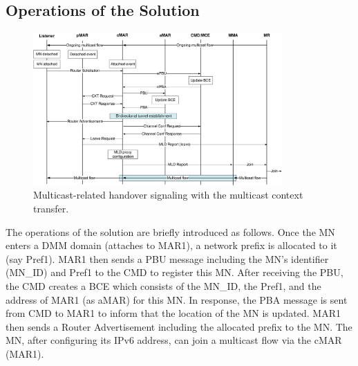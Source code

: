 \subsection{Operations of the Solution}
\begin{figure}[tb!] 
  \begin{center} 
    \includegraphics[width=0.85\textwidth]{./Part3/Chapter8/figures/c10_service_disruption_CXT_MMA.eps} 
    \caption{Multicast-related handover signaling with the multicast context transfer.}
    \label{fig:c10_handover_signaling}
  \end{center} 
\end{figure}

The operations of the solution are briefly introduced as follows. Once the MN enters a DMM domain (attaches to MAR1), a network prefix is allocated to it (say Pref1). MAR1 then sends a PBU message including the MN's identifier (MN\_ID) and Pref1 to the CMD to register this MN. After receiving the PBU, the CMD creates a BCE which consists of the MN\_ID, the Pref1, and the address of MAR1 (as aMAR) for this MN. In response, the PBA message is sent from CMD to MAR1 to inform that the location of the MN is updated. MAR1 then sends a Router Advertisement including the allocated prefix to the MN. The MN, after configuring its IPv6 address, can join a multicast flow via the cMAR (MAR1).

